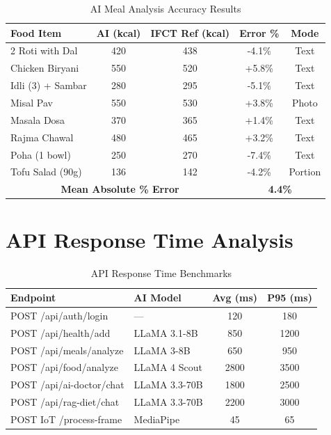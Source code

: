\documentclass[12pt,a4paper]{report}
\begin{document}
\begin{table}[H]
\centering
\caption{AI Meal Analysis Accuracy Results}
\label{tab:mealaccuracy}
\begin{tabular}{|l|c|c|c|c|}
\hline
\textbf{Food Item} & \textbf{AI (kcal)} & \textbf{IFCT Ref (kcal)} & \textbf{Error \%} & \textbf{Mode} \\
\hline
2 Roti with Dal & 420 & 438 & -4.1\% & Text \\
Chicken Biryani & 550 & 520 & +5.8\% & Text \\
Idli (3) + Sambar & 280 & 295 & -5.1\% & Text \\
Misal Pav & 550 & 530 & +3.8\% & Photo \\
Masala Dosa & 370 & 365 & +1.4\% & Text \\
Rajma Chawal & 480 & 465 & +3.2\% & Text \\
Poha (1 bowl) & 250 & 270 & -7.4\% & Text \\
Tofu Salad (90g) & 136 & 142 & -4.2\% & Portion \\
\hline
\multicolumn{3}{|c|}{\textbf{Mean Absolute \% Error}} & \multicolumn{2}{c|}{\textbf{4.4\%}} \\
\hline
\end{tabular}
\end{table}

\section{API Response Time Analysis}

\begin{table}[H]
\centering
\caption{API Response Time Benchmarks}
\label{tab:apitime}
\begin{tabular}{|l|l|c|c|}
\hline
\textbf{Endpoint} & \textbf{AI Model} & \textbf{Avg (ms)} & \textbf{P95 (ms)} \\
\hline
POST /api/auth/login & --- & 120 & 180 \\
POST /api/health/add & LLaMA 3.1-8B & 850 & 1200 \\
POST /api/meals/analyze & LLaMA 3-8B & 650 & 950 \\
POST /api/food/analyze & LLaMA 4 Scout & 2800 & 3500 \\
POST /api/ai-doctor/chat & LLaMA 3.3-70B & 1800 & 2500 \\
POST /api/rag-diet/chat & LLaMA 3.3-70B & 2200 & 3000 \\
POST IoT /process-frame & MediaPipe & 45 & 65 \\
\hline
\end{tabular}
\end{table}
\end{document}
